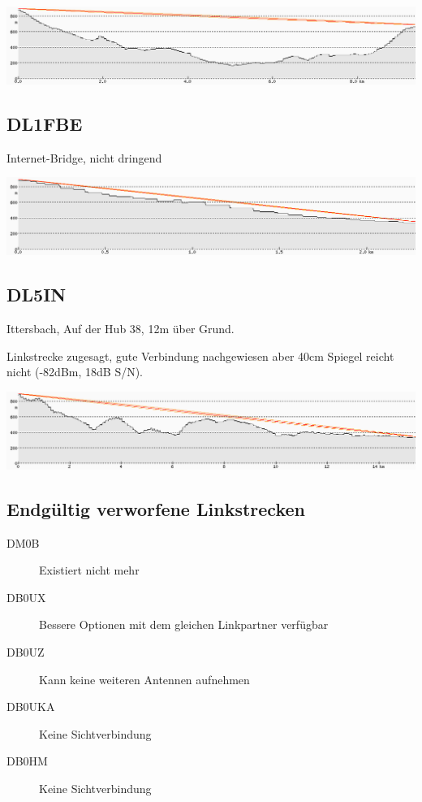 \documentclass[a4paper]{scrartcl}
\begin{document}
\includegraphics[width=\linewidth]{Bilder/Profil_DB0SWF}

\subsection{DL1FBE}
Internet-Bridge, nicht dringend

\includegraphics[width=\linewidth]{Bilder/Profil_DL1FBE}

\subsection{DL5IN}
Ittersbach, Auf der Hub 38, 12m \"uber Grund.

Linkstrecke zugesagt, gute Verbindung nachgewiesen aber 40cm Spiegel reicht nicht (-82dBm, 18dB S/N).

\includegraphics[width=\linewidth]{Bilder/Profil_DL5IN_48_877956_8_511058.png}

\subsection{Endg\"ultig verworfene Linkstrecken}
\begin{description}
    \item[DM0B] Existiert nicht mehr
    \item[DB0UX] Bessere Optionen mit dem gleichen Linkpartner verf\"ugbar
    \item[DB0UZ] Kann keine weiteren Antennen aufnehmen
    \item[DB0UKA] Keine Sichtverbindung
    \item[DB0HM] Keine Sichtverbindung
\end{description}
\end{document}
